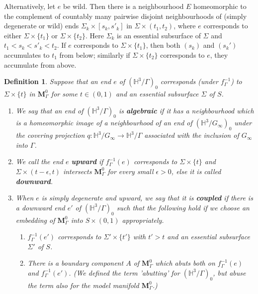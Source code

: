 \documentclass{amsart}
\newtheorem{definition}[theorem]{Definition}
\theoremstyle{definition}
\newcommand{\hyperbolic}{\mathbb{H}}
\newcommand\HHH{{\mathbb H}}
\begin{document}
Alternatively, let 
 $e$ be wild. Then there is a neighbourhood $E$   homeomorphic to the complement of countably many pairwise disjoint neighbourhoods of (simply degenerate or wild) ends $\Sigma_k \times [s_k, s'_k]$ in $\Sigma \times (t_1, t_2)$, where $e$ corresponds to either $\Sigma \times \{t_1\}$ or $\Sigma \times \{t_2\}$. Here $\Sigma_k$ is an essential subsurface of $\Sigma$ and $t_1 < s_k < s'_k < t_2$. If $e$ corresponds to $\Sigma \times \{t_1\}$, then both $(s_k)$ and $(s_k')$ accumulates to $t_1$ from below; similarly if $\Sigma \times \{t_2\}$ corresponds to $e$, they accumulate from above. 
\begin{definition}
\label{def coupled}
	Suppose that an end $e$ of $(\HHH^3/\Gamma)_0$ corresponds (under $f_\Gamma^{-1}$)  to $\Sigma \times \{t\}$ in $\mathbf M_\Gamma^0$ for some $t \in (0,1)$ and an essential subsurface $\Sigma$ of $S$.
	\begin{enumerate}
		\item We say that an end of $(\hyperbolic^3/\Gamma)_0$ is {\bf algebraic} if it has a neighbourhood which is a homeomorphic image of a neighbourhood of an end of $(\hyperbolic^3/G_\infty)_0$ under the covering projection $q\colon \hyperbolic^3/G_\infty \to \HHH^3/\Gamma$ associated with the inclusion of $G_\infty$ into $\Gamma$.
		\item	
		We call the end $e$ {\bf upward} if $f_\Gamma^{-1}(e)$ corresponds to $\Sigma \times \{t\}$ and $\Sigma \times (t-\epsilon, t)$ intersects $\mathbf M_\Gamma^0$ for every small $\epsilon > 0$, else it is called   {\bf downward}.
		\item
		When $e$ is simply degenerate and upward, we say that it is {\bf coupled} if there is a downward end $e'$ of $(\HHH^3/\Gamma)_0$ such that the following hold if we choose an embedding of $\mathbf M_\Gamma^0$ into $S \times (0,1)$ appropriately.		
		\begin{enumerate}
		\item $f_\Gamma^{-1}(e')$ corresponds to $\Sigma' \times \{t'\}$ with $t' >t$ and an essential subsurface $\Sigma'$ of $S$.
		\item There is a boundary component $A$ of $\mathbf M_\Gamma^0$ which abuts both on $f_\Gamma^{-1}(e)$ and $f_\Gamma^{-1}(e')$.
		(We defined the term 'abutting' for $(\HHH^3/\Gamma)_0$, but abuse the term also for the model manifold $\mathbf M_\Gamma^0$.)

\end{enumerate}
\end{enumerate}
\end{definition}
\end{document}
